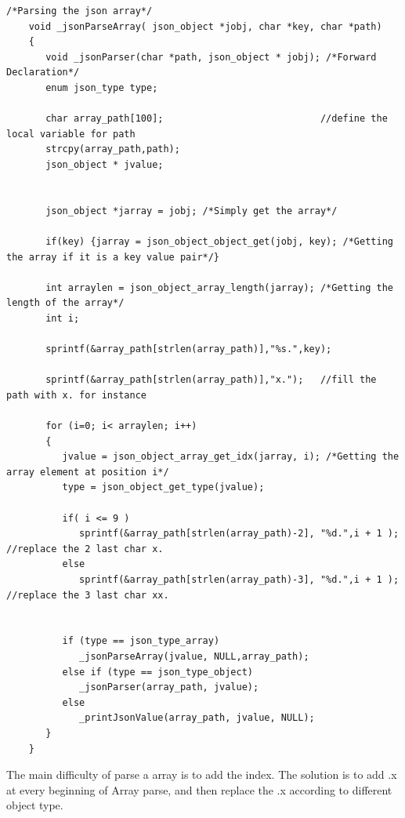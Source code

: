 \begin{lstlisting}[mathescape]
    /*Parsing the json array*/
    void _jsonParseArray( json_object *jobj, char *key, char *path)
    {
       void _jsonParser(char *path, json_object * jobj); /*Forward Declaration*/
       enum json_type type;

       char array_path[100];                            //define the local variable for path
       strcpy(array_path,path);
       json_object * jvalue;


       json_object *jarray = jobj; /*Simply get the array*/

       if(key) {jarray = json_object_object_get(jobj, key); /*Getting the array if it is a key value pair*/}

       int arraylen = json_object_array_length(jarray); /*Getting the length of the array*/
       int i;

       sprintf(&array_path[strlen(array_path)],"%s.",key);

       sprintf(&array_path[strlen(array_path)],"x.");   //fill the path with x. for instance

       for (i=0; i< arraylen; i++)
       {
          jvalue = json_object_array_get_idx(jarray, i); /*Getting the array element at position i*/
          type = json_object_get_type(jvalue);

          if( i <= 9 )
             sprintf(&array_path[strlen(array_path)-2], "%d.",i + 1 );  //replace the 2 last char x.
          else
             sprintf(&array_path[strlen(array_path)-3], "%d.",i + 1 );  //replace the 3 last char xx.


          if (type == json_type_array)
             _jsonParseArray(jvalue, NULL,array_path);
          else if (type == json_type_object)
             _jsonParser(array_path, jvalue);
          else
             _printJsonValue(array_path, jvalue, NULL);
       }
    }
\end{lstlisting}

The main difficulty of parse a array is to add the index. The solution is to add .x at every beginning of Array parse, and then replace the .x according to different object type.

